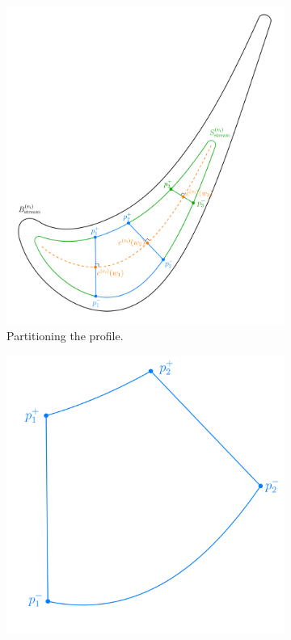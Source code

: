 \documentclass[a4paper, 11pt]{report}
\theoremstyle{definition}
\begin{document}
	\begin{figure}[H]
		\centering
		\begin{subfigure}{.65\textwidth}
			\includegraphics[width=\textwidth]{../tec/chambers/61.png}
			\caption{Partitioning the profile.}
		\end{subfigure}
		\begin{subfigure}{.33\textwidth}
			\includegraphics[width=\textwidth]{../tec/chambers/62.png}

\end{subfigure}
\end{figure}
\end{document}
